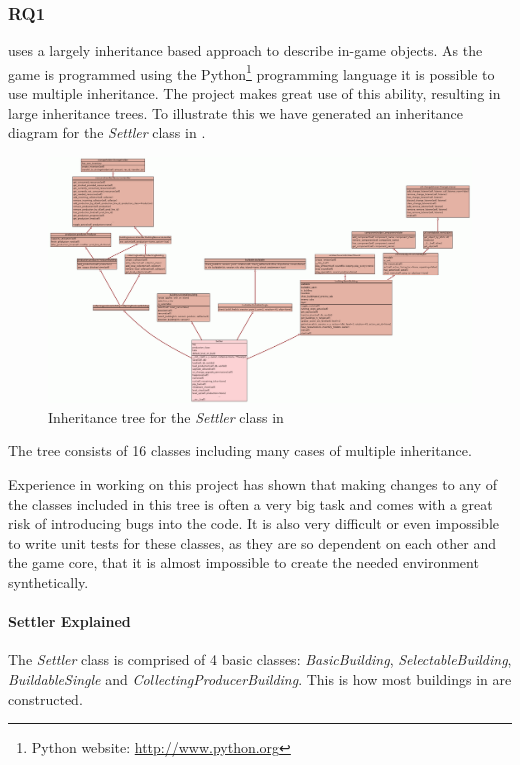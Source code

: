 \subsubsection{RQ1}
\UH{} uses a largely inheritance based approach to describe in-game objects. As the game is programmed using
the Python\footnote{Python website: \url{http://www.python.org}} programming language it is possible to use multiple
inheritance. The project makes great use of this ability, resulting in large inheritance trees. To illustrate this we
have generated an inheritance diagram for the \textit{Settler} class in . 
\begin{figure}[!htb]
\includegraphics[angle=90,scale=0.25]{pics/settler_uml}
\caption{Inheritance tree for the \textit{Settler} class in \UH{}}
\label{fig:settleruml}
\end{figure}
The tree consists of 16 classes including many cases of multiple inheritance. 

Experience in working on this project has shown that making changes to any of the classes included in this tree is often
a very big task and comes with a great risk of introducing bugs into the code. It is also very difficult or even
impossible to write unit tests for these classes, as they are so dependent on each other and the game core, that it is
almost impossible to create the needed environment synthetically.

\paragraph{Settler Explained}
The \textit{Settler} class is comprised of 4 basic classes: \textit{BasicBuilding}, \textit{SelectableBuilding},
\textit{BuildableSingle} and \textit{CollectingProducerBuilding}. This is how most buildings in \UH{} are constructed. 

